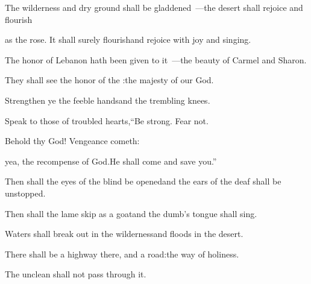 
\begin{inparaenum}
  \pa{} The wilderness and dry ground shall be gladdened~---\pa{}the desert shall rejoice and flourish%

  \pa{}as the rose.  It shall surely flourish\pa{}and rejoice with joy and singing.%

  \pa{}The honor of Lebanon hath been given to it~---\pa{}the beauty of Carmel and Sharon.%

  \pa{}They shall see the honor of the \lord:\pa{}the majesty of our God.%

  \pb{} Strengthen ye the feeble hands\pa{}and the trembling knees.%

  \pa{} Speak to those of troubled hearts,\pa{}``Be strong. Fear not.%

  \pa{}Behold thy God! Vengeance cometh:%

  \pa{}yea, the recompense of God.\pa{}He shall come and save you.''%

  \pb{} Then shall the eyes of the blind be opened\pa{}and the ears of the deaf shall be unstopped.%

  \pa{} Then shall the lame skip as a goat\pa{}and the dumb's tongue shall sing.%

  \pa{}Waters shall break out in the wilderness\pa{}and floods in the desert.%

  \pb{} There shall be a highway there, and a road:\pa{}the way of holiness.%

  \pb{}The unclean shall not pass through it.%
\end{inparaenum}
